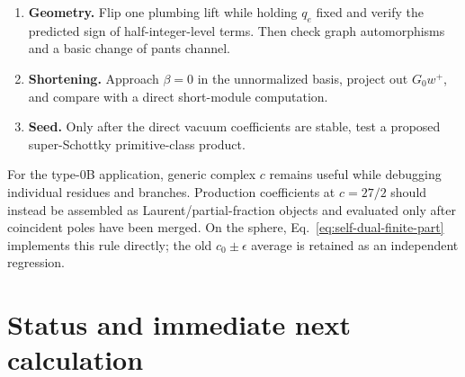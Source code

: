 \documentclass[11pt]{article}
\begin{document}
\begin{enumerate}
 ordered matrix recursion before applying the odd-plumbing or GSO projector.
 \item \textbf{Geometry.} Flip one plumbing lift while holding $q_e$ fixed
 and verify the predicted sign of half-integer-level terms.  Then check graph
 automorphisms and a basic change of pants channel.
 \item \textbf{Shortening.} Approach $\beta=0$ in the unnormalized basis,
 project out $G_0w^+$, and compare with a direct short-module computation.
 \item \textbf{Seed.} Only after the direct vacuum coefficients are stable,
 test a proposed super-Schottky primitive-class product.
\end{enumerate}

For the type-0B application, generic complex $c$ remains useful while
debugging individual residues and branches.  Production coefficients at
$c=27/2$ should instead be assembled as Laurent/partial-fraction objects and
evaluated only after coincident poles have been merged.  On the sphere,
Eq.~\eqref{eq:self-dual-finite-part} implements this rule directly; the old
$c_0\pm\epsilon$ average is retained as an independent regression.

\section{Status and immediate next calculation}
\end{document}
